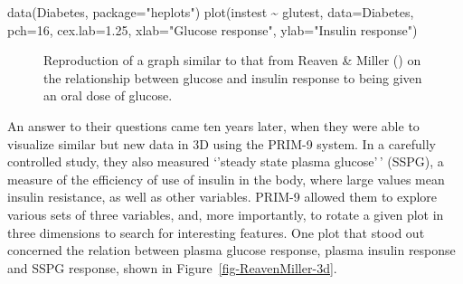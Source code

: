 \documentclass[
  letterpaper,
  10pt,
  krantz2]{krantz}
\makeatletter
\newenvironment{Shaded}{\begin{snugshade}}{\end{snugshade}}
\newcommand{\AttributeTok}[1]{\textcolor[rgb]{0.40,0.45,0.13}{#1}}
\newcommand{\DecValTok}[1]{\textcolor[rgb]{0.68,0.00,0.00}{#1}}
\newcommand{\FloatTok}[1]{\textcolor[rgb]{0.68,0.00,0.00}{#1}}
\newcommand{\FunctionTok}[1]{\textcolor[rgb]{0.28,0.35,0.67}{#1}}
\newcommand{\NormalTok}[1]{\textcolor[rgb]{0.00,0.23,0.31}{#1}}
\newcommand{\SpecialCharTok}[1]{\textcolor[rgb]{0.37,0.37,0.37}{#1}}
\newcommand{\StringTok}[1]{\textcolor[rgb]{0.13,0.47,0.30}{#1}}
\newenvironment{kframe}{%
  \medskip{}
  \setlength{\fboxsep}{.8em}
  \def\at@end@of@kframe{}%
  \ifinner\ifhmode%
  \def\at@end@of@kframe{\end{minipage}}%
  \begin{minipage}{\columnwidth}%
  \fi\fi%
  \def\FrameCommand##1{\hskip\@totalleftmargin \hskip-\fboxsep
  \colorbox{shadecolor}{##1}\hskip-\fboxsep
      \hskip-\linewidth \hskip-\@totalleftmargin \hskip\columnwidth}%
  \MakeFramed {\advance\hsize-\width
    \@totalleftmargin\z@ \linewidth\hsize
    \@setminipage}}%
{\par\unskip\endMakeFramed%
  \at@end@of@kframe}
\renewenvironment{Shaded}{\begin{kframe}}{\end{kframe}}
\makeatother
\begin{document}
\begin{Shaded}
\begin{Highlighting}[]
\FunctionTok{data}\NormalTok{(Diabetes, }\AttributeTok{package=}\StringTok{"heplots"}\NormalTok{)}
\FunctionTok{plot}\NormalTok{(instest }\SpecialCharTok{\textasciitilde{}}\NormalTok{ glutest, }\AttributeTok{data=}\NormalTok{Diabetes, }
     \AttributeTok{pch=}\DecValTok{16}\NormalTok{,}
     \AttributeTok{cex.lab=}\FloatTok{1.25}\NormalTok{,}
     \AttributeTok{xlab=}\StringTok{"Glucose response"}\NormalTok{,}
     \AttributeTok{ylab=}\StringTok{"Insulin response"}\NormalTok{)}
\end{Highlighting}
\end{Shaded}

\begin{figure}


\caption{\label{fig-diabetes1}Reproduction of a graph similar to that
from Reaven \& Miller () on the
relationship between glucose and insulin response to being given an oral
dose of glucose.}

\end{figure}%

An answer to their questions came ten years later, when they were able
to visualize similar but new data in 3D using the PRIM-9 system. In a
carefully controlled study, they also measured `'steady state plasma
glucose'\,' (SSPG), a measure of the efficiency of use of insulin in the
body, where large values mean insulin resistance, as well as other
variables. PRIM-9 allowed them to explore various sets of three
variables, and, more importantly, to rotate a given plot in three
dimensions to search for interesting features. One plot that stood out
concerned the relation between plasma glucose response, plasma insulin
response and SSPG response, shown in Figure~\ref{fig-ReavenMiller-3d}.
\end{document}
